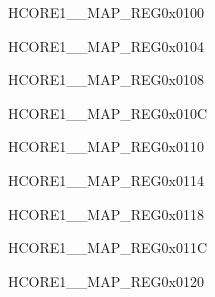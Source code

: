 \begin{register}{H}{CORE1\_\_MAP\_REG}{0x0100}\label{regdesc:CORE1AXIPDMAINCH2INTMAPREG}
\end{register}\vspace{-3em}


\begin{register}{H}{CORE1\_\_MAP\_REG}{0x0104}\label{regdesc:CORE1AXIPDMAOUTCH0INTMAPREG}
\end{register}\vspace{-3em}


\begin{register}{H}{CORE1\_\_MAP\_REG}{0x0108}\label{regdesc:CORE1AXIPDMAOUTCH1INTMAPREG}
\end{register}\vspace{-3em}


\begin{register}{H}{CORE1\_\_MAP\_REG}{0x010C}\label{regdesc:CORE1AXIPDMAOUTCH2INTMAPREG}
\end{register}\vspace{-3em}


\begin{register}{H}{CORE1\_\_MAP\_REG}{0x0110}\label{regdesc:CORE1RSAINTMAPREG}
\end{register}\vspace{-3em}


\begin{register}{H}{CORE1\_\_MAP\_REG}{0x0114}\label{regdesc:CORE1AESINTMAPREG}
\end{register}\vspace{-3em}


\begin{register}{H}{CORE1\_\_MAP\_REG}{0x0118}\label{regdesc:CORE1SHAINTMAPREG}
\end{register}\vspace{-3em}


\begin{register}{H}{CORE1\_\_MAP\_REG}{0x011C}\label{regdesc:CORE1ECCINTMAPREG}
\end{register}\vspace{-3em}


\begin{register}{H}{CORE1\_\_MAP\_REG}{0x0120}\label{regdesc:CORE1ECDSAINTMAPREG}
\end{register}\vspace{-3em}


